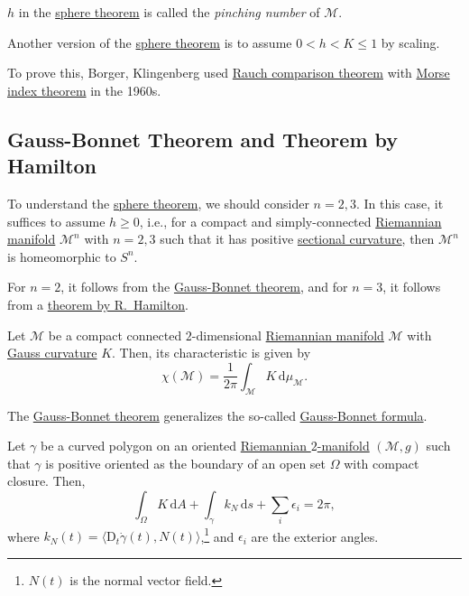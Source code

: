 \begin{notation}
	\(h\) in the \hyperref[thm:sphere]{sphere theorem} is called the \emph{pinching number} of \(\mathcal{M} \).
\end{notation}

\begin{remark}\label{rmk:sphere-theorem-scaling}
	Another version of the \hyperref[thm:sphere]{sphere theorem} is to assume \(0 < h < K \leq 1\) by scaling.
\end{remark}

To prove this, Borger, Klingenberg used \hyperref[thm:Rauch-comparison]{Rauch comparison theorem}  with \hyperref[thm:Morse-index]{Morse index theorem} in the 1960s.

\subsection{Gauss-Bonnet Theorem and Theorem by Hamilton}
To understand the  \hyperref[thm:sphere]{sphere theorem}, we should consider \(n = 2, 3\). In this case, it suffices to assume \(h \geq 0\), i.e., for a compact and simply-connected \hyperref[def:Riemannian-manifold]{Riemannian manifold} \(\mathcal{M} ^n \) with \(n = 2, 3\) such that it has positive \hyperref[def:sectional-curvature]{sectional curvature}, then \(\mathcal{M} ^n\) is homeomorphic to \(S^n\).

\begin{note}
	For \(n = 2\), it follows from the \hyperref[thm:Gauss-Bonnet]{Gauss-Bonnet theorem}, and for \(n = 3\), it follows from a \hyperref[thm:Hamilton]{theorem by R.\ Hamilton}.
\end{note}

\begin{theorem}\label{thm:Gauss-Bonnet}
	Let \(\mathcal{M} \) be a compact connected \(2\)-dimensional \hyperref[def:Riemannian-manifold]{Riemannian manifold} \(\mathcal{M} \) with \hyperref[rmk:Gauss-curvature]{Gauss curvature} \(K\). Then, its characteristic is given by
	\[
		\chi (\mathcal{M} ) = \frac{1}{2\pi } \int _\mathcal{M} K \,\mathrm{d} \mu _{\mathcal{M} }.
	\]
\end{theorem}

The \hyperref[thm:Gauss-Bonnet]{Gauss-Bonnet theorem} generalizes the so-called \hyperref[note:Gauss-Bonnet-formula]{Gauss-Bonnet formula}.

\begin{note}\label{note:Gauss-Bonnet-formula}
	Let \(\gamma \) be a curved polygon on an oriented \hyperref[def:Riemannian-manifold]{Riemannian \(2\)-manifold} \((\mathcal{M} , g)\) such that \(\gamma \) is positive oriented as the boundary of an open set \(\Omega \) with compact closure. Then,
	\[
		\int _\Omega K \,\mathrm{d} A + \int _{\gamma } k_N\,\mathrm{d} s + \sum_{i} \epsilon _i = 2\pi ,
	\]
	where \(k_N(t) = \langle \mathrm{D} _t \dot{\gamma }(t), N(t)  \rangle \),\footnote{\(N(t)\) is the normal vector field.} and \(\epsilon _i\) are the exterior angles.
\end{note}

